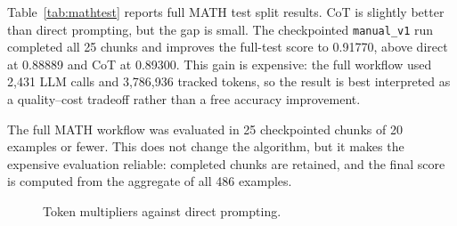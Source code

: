 \documentclass{article}
\begin{document}
Table~\ref{tab:mathtest} reports full MATH test split results. CoT is slightly better than direct prompting, but the gap is small. The checkpointed \texttt{manual\_v1} run completed all 25 chunks and improves the full-test score to 0.91770, above direct at 0.88889 and CoT at 0.89300. This gain is expensive: the full workflow used 2,431 LLM calls and 3,786,936 tracked tokens, so the result is best interpreted as a quality--cost tradeoff rather than a free accuracy improvement.

The full MATH workflow was evaluated in 25 checkpointed chunks of 20 examples or fewer. This does not change the algorithm, but it makes the expensive evaluation reliable: completed chunks are retained, and the final score is computed from the aggregate of all 486 examples.

\begin{table}[t]
\caption{Efficiency tradeoffs against direct prompting.}
\label{tab:efficiency}
\vskip 0.08in
\begin{center}
\begin{scriptsize}
\setlength{\tabcolsep}{3pt}
\end{scriptsize}
\end{center}
\end{table}

\begin{figure}[t]
\caption{Token multipliers against direct prompting.}
\label{fig:tokenmultipliers}
\vskip 0.08in
\begin{center}
\end{center}
\end{figure}
\end{document}
